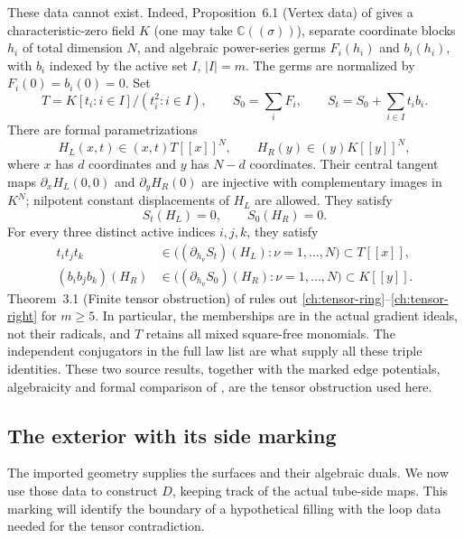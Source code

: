 \documentclass[11pt]{article}
\theoremstyle{definition}
\theoremstyle{remark}
\begin{document}
These data cannot exist.  Indeed, Proposition~6.1 (Vertex data) of
\cite{TO} gives a characteristic-zero field $K$ (one may take
$\mathbb C((\sigma))$), separate coordinate blocks $h_i$ of total
dimension $N$, and algebraic power-series germs $F_i(h_i)$ and
$b_i(h_i)$, with $b_i$ indexed by the active set $I$, $|I|=m$.
The germs are normalized by $F_i(0)=b_i(0)=0$.  Set
\begin{equation}
\label{ch:tensor-ring}
 T=K[t_i:i\in I]/(t_i^2:i\in I),\qquad
 S_0=\sum_iF_i,\qquad S_t=S_0+\sum_{i\in I}t_i b_i.
\end{equation}
There are formal parametrizations
\[
 H_L(x,t)\in(x,t)T[[x]]^N,\qquad
 H_R(y)\in(y)K[[y]]^N,
\]
where $x$ has $d$ coordinates and $y$ has $N-d$ coordinates.  Their
central tangent maps $\partial_xH_L(0,0)$ and $\partial_yH_R(0)$
are injective with complementary images in $K^N$; nilpotent constant
displacements of $H_L$ are allowed.  They satisfy
\begin{equation}
\label{ch:tensor-vanishing}
 S_t(H_L)=0,\qquad S_0(H_R)=0.
\end{equation}
For every three distinct active indices $i,j,k$, they satisfy
\begin{align}
 t_it_jt_k&\in
 \bigl((\partial_{h_\nu}S_t)(H_L):\nu=1,\ldots,N\bigr)
                  \subset T[[x]],\label{ch:tensor-left}\\
 (b_ib_jb_k)(H_R)&\in
 \bigl((\partial_{h_\nu}S_0)(H_R):\nu=1,\ldots,N\bigr)
                  \subset K[[y]].\label{ch:tensor-right}
\end{align}
Theorem~3.1 (Finite tensor obstruction) of \cite{TO} rules out
\eqref{ch:tensor-ring}--\eqref{ch:tensor-right} for $m\geq5$.
In particular, the memberships are in the actual gradient ideals,
not their radicals, and $T$ retains all mixed square-free monomials.
The independent conjugators in the full law list are what supply all
these triple identities. These two source results, together with the
marked edge potentials, algebraicity and formal comparison of
\cite[Proposition~4.5, Theorem~5.1 and Proposition~5.2]{TO}, are the
tensor obstruction used here.

\subsection{The exterior with its side marking}
\label{ch:exterior}

The imported geometry supplies the surfaces and their algebraic duals.
We now use those data to construct $D$, keeping track of the actual
tube-side maps. This marking will identify the boundary of a hypothetical
filling with the loop data needed for the tensor contradiction.
\end{document}
